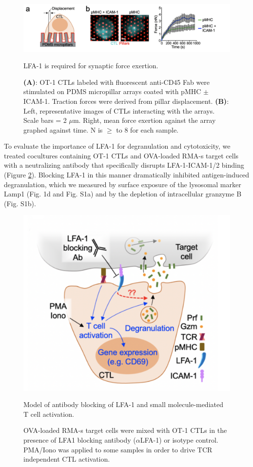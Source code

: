 \begin{figure}[htbp]
	\centering
	\includegraphics[width=\textwidth]{../figures/chapter3/fig1pillarswithouticam.png}
	\caption{LFA-1 is required for synaptic force exertion.}
	\caption*{\textbf{(A)}: OT-1 CTLs labeled with fluorescent anti-CD45 Fab were stimulated on PDMS micropillar arrays coated with pMHC $\pm$ ICAM-1. Traction forces were derived from pillar displacement.  \textbf{(B)}: Left, representative images of CTLs interacting with the arrays. Scale bars = 2 $\mu$m.  Right, mean force exertion against the array graphed against time. N is $\geq$ to 8 for each sample.}
	\label{fig:fig1pillarswithouticam}
\end{figure}

To evaluate the importance of LFA-1 for degranulation and cytotoxicity, we treated cocultures containing OT-1 CTLs and OVA-loaded RMA-s target cells with a neutralizing antibody that specifically disrupts LFA-1-ICAM-1/2 binding (Figure \ref{fig:fig1lfablockmodel}). Blocking LFA-1 in this manner dramatically inhibited antigen-induced degranulation, which we measured by surface exposure of the lysosomal marker Lamp1 (Fig. 1d and Fig. S1a) and by the depletion of intracellular granzyme B (Fig. S1b). 

\begin{figure}[htbp]
	\centering
	\includegraphics[width=0.9\columnwidth]{../figures/chapter3/fig1lfablockmodel.png}
	\caption{Model of antibody blocking of LFA-1 and small molecule-mediated T cell activation.}
	\caption*{OVA-loaded RMA-s target cells were mixed with OT-1 CTLs in the presence of LFA1 blocking antibody ($\alpha$LFA-1) or isotype control. PMA/Iono was applied to some samples in order to drive TCR independent CTL activation.}
	\label{fig:fig1lfablockmodel}
\end{figure}

